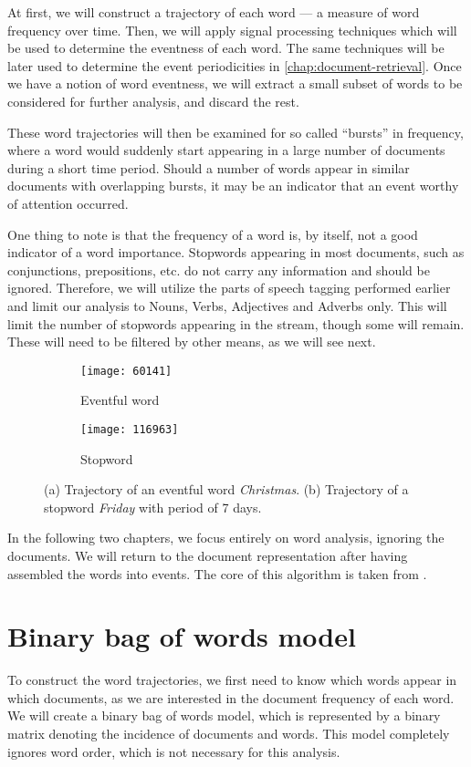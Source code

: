 At first, we will construct a trajectory of each word --- a measure of word frequency over time. Then, we will apply signal processing techniques which will be used to determine the eventness of each word. The same techniques will be later used to determine the event periodicities in \autoref{chap:document-retrieval}. Once we have a notion of word eventness, we will extract a small subset of words to be considered for further analysis, and discard the rest.

These word trajectories will then be examined for so called ``bursts'' in frequency, where a word would suddenly start appearing in a large number of documents during a short time period. Should a number of words appear in similar documents with overlapping bursts, it may be an indicator that an event worthy of attention occurred.

One thing to note is that the frequency of a word is, by itself, not a good indicator of a word importance.
Stopwords appearing in most documents, such as conjunctions, prepositions, etc. do not carry any information and should be ignored. Therefore, we will utilize the parts of speech tagging performed earlier and limit our analysis to Nouns, Verbs, Adjectives and Adverbs only. This will limit the number of stopwords appearing in the stream, though some will remain. These will need to be filtered by other means, as we will see next.

\begin{figure}
\centering
\begin{subfigure}{.5\textwidth}
  \centering
  \texttt{[image: 60141]}  %
  \caption{Eventful word}
  \label{fig:vanoce}
\end{subfigure}%
\begin{subfigure}{.5\textwidth}
  \centering
  \texttt{[image: 116963]}  %
  \caption{Stopword}
  \label{fig:patek}
\end{subfigure}
\caption{(a) Trajectory of an eventful word \textit{Christmas}. (b) Trajectory of a stopword \textit{Friday} with period of 7 days.}
\end{figure}

In the following two chapters, we focus entirely on word analysis, ignoring the documents. We will return to the document representation after having assembled the words into events. The core of this algorithm is taken from \cite{event-detection}.


\section{Binary bag of words model}
To construct the word trajectories, we first need to know which words appear in which documents, as we are interested in the document frequency of each word. We will create a binary bag of words model, which is represented by a binary matrix denoting the incidence of documents and words. This model completely ignores word order, which is not necessary for this analysis.


